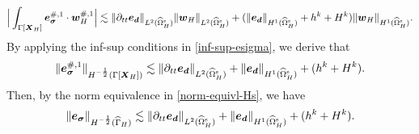 \documentclass[11pt,reqno]{amsart}
\theoremstyle{definition}
\theoremstyle{plain}
\numberwithin{theorem}{section}
\numberwithin{proposition}{section}
\numberwithin{lemma}{section}
\numberwithin{equation}{section}
\newcommand{\bs}[1]{\boldsymbol{#1}}
\newcommand{\dep}{{{\bs{d}}}}
\newcommand{\bw}{{\bs w}}
\renewcommand{\(}{\bigl(}
\renewcommand{\)}{\bigr)}
\begin{document}
\begin{align}\label{esigma-wH-pair}
\Big|\int_{\Gamma[\bs X_H]} {\bs e}_{\bs\sigma}^{\#,1} \cdot \bw_H^{\#,1} \Big|
\lesssim 
\|\partial_{tt}{\bs e}_{\dep}\|_{L^2(\widehat{\Omega}^{\rm s}_H)} \|{\bs w}_H\|_{L^2(\widehat\Omega^{\rm s}_H)}
+ (\|{\bs e}_\dep\|_{H^1(\widehat{\Omega}^{\rm s}_H)} 
+ h^k+H^k) \|{\bs w}_H\|_{H^1(\widehat\Omega^{\rm s}_H)} . 
\end{align}
By applying the inf-sup conditions in \eqref{inf-sup-esigma}, we derive that 
\begin{align}\label{esigma-H-half}
\| {\bs e}_{\bs\sigma}^{\#,1}\|_{H^{-\frac12}(\Gamma[{\bs X}_H])} 
\lesssim 
\|\partial_{tt}{\bs e}_{\dep}\|_{L^2(\widehat{\Omega}^{\rm s}_H)} 
+ \|{\bs e}_\dep\|_{H^1(\widehat{\Omega}^{\rm s}_H)} 
+ (h^k+H^k) . 
\end{align} 
Then, by the norm equivalence in \eqref{norm-equivl-Hs}, we have
\begin{align}\label{esigma-H-half-hat}
\| {\bs e}_{\bs\sigma}\|_{H^{-\frac12}(\widehat\Gamma_H)} 
\lesssim 
\|\partial_{tt}{\bs e}_{\dep}\|_{L^2(\widehat{\Omega}^{\rm s}_H)} 
+ \|{\bs e}_\dep\|_{H^1(\widehat{\Omega}^{\rm s}_H)} 
+ (h^k+H^k) . 
\end{align}
\end{document}
